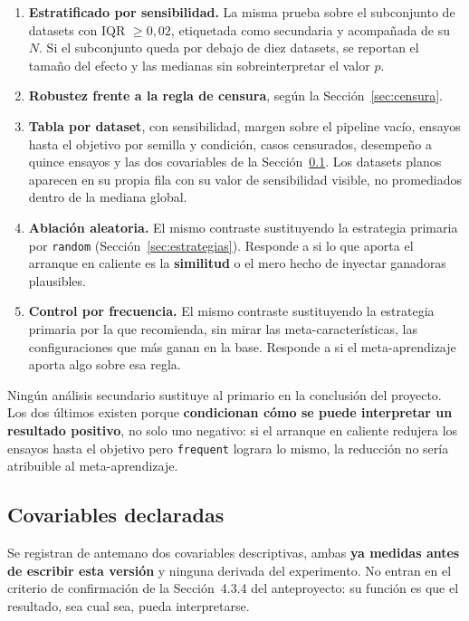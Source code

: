 \documentclass[11pt,letterpaper]{article}
\begin{document}
\begin{enumerate}
  \item \textbf{Estratificado por sensibilidad.} La misma prueba sobre el
        subconjunto de datasets con IQR $\geq 0{,}02$, etiquetada como secundaria
        y acompañada de su $N$. Si el subconjunto queda por debajo de diez
        datasets, se reportan el tamaño del efecto y las medianas sin
        sobreinterpretar el valor $p$.
  \item \textbf{Robustez frente a la regla de censura}, según la
        Sección~\ref{sec:censura}.
  \item \textbf{Tabla por dataset}, con sensibilidad, margen sobre el pipeline
        vacío, ensayos hasta el objetivo por semilla y condición, casos
        censurados, desempeño a quince ensayos y las dos covariables de la
        Sección~\ref{sec:covariables}. Los datasets planos aparecen en su propia
        fila con su valor de sensibilidad visible, no promediados dentro de la
        mediana global.
  \item \textbf{Ablación aleatoria.} El mismo contraste sustituyendo la
        estrategia primaria por \texttt{random} (Sección~\ref{sec:estrategias}).
        Responde a si lo que aporta el arranque en caliente es la
        \textbf{similitud} o el mero hecho de inyectar ganadoras plausibles.
  \item \textbf{Control por frecuencia.} El mismo contraste sustituyendo la
        estrategia primaria por la que recomienda, sin mirar las
        meta-características, las configuraciones que más ganan en la base.
        Responde a si el meta-aprendizaje aporta algo sobre esa regla.
\end{enumerate}

Ningún análisis secundario sustituye al primario en la conclusión del proyecto.
Los dos últimos existen porque \textbf{condicionan cómo se puede interpretar un
resultado positivo}, no solo uno negativo: si el arranque en caliente redujera los
ensayos hasta el objetivo pero \texttt{frequent} lograra lo mismo, la reducción no
sería atribuible al meta-aprendizaje.

\subsection{Covariables declaradas}
\label{sec:covariables}

Se registran de antemano dos covariables descriptivas, ambas \textbf{ya medidas
antes de escribir esta versión} y ninguna derivada del experimento. No entran en
el criterio de confirmación de la Sección~4.3.4 del anteproyecto: su función es
que el resultado, sea cual sea, pueda interpretarse.
\end{document}
